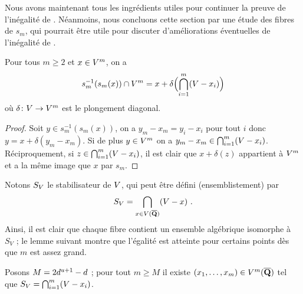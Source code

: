 Nous avons maintenant tous les ingrédients utiles pour continuer la preuve de
l'inégalité de . Néanmoins, nous concluons cette section par une
étude des fibres de \( s_m \), qui pourrait être utile pour discuter
d'améliorations éventuelles de l'inégalité de .

\begin{lem}
  Pour tous \( m \ge 2 \) et \( x \in V^m \), on a
  \begin{equation}
    s_m^{-1} ( s_m(x) ) \cap V^m
    =
    x + \delta\Bigl( \bigcap_{i=1}^m (V - x_i) \Bigr)
  \end{equation}
  où \( \delta \colon V \to V^m \) est le plongement diagonal.
\end{lem}

\begin{proof}
  Soit \( y \in s_m^{-1} ( s_m(x) ) \), on a
  \( y_m - x_m = y_i - x_i \) pour tout \( i \) donc \( y = x + \delta(y_m -
    x_m) \). Si de plus \( y \in V^m \) on a \( y_m - x_m \in
    \bigcap_{i=1}^m (V - x_i) \). Réciproquement, si \( z \in
    \bigcap_{i=1}^m (V - x_i) \), il est clair que \( x + \delta(z) \)
  appartient à \( V^m \) et a la même image que \( x \) par \( s_m \).
\end{proof}

Notons \( S_V \) le stabilisateur de \( V \), qui peut être défini
(ensemblistement) par
\begin{equation}
  S_V = \bigcap_{x \in V(\overline{{\mathbf{Q}}})} (V - x)
  \text{ .}
\end{equation}
Ainsi, il est clair que chaque fibre contient un ensemble algébrique isomorphe
à \( S_V \) ; le lemme suivant montre que l'égalité est atteinte pour certains
points dès que \( m \) est assez grand.

\begin{lem}
  Posons \( M = 2 d^{u+1} - d \) ; pour tout \( m \ge M \) il
  existe \( (x_1, \dots, x_m) \in V^m(\overline{{\mathbf{Q}}}) \) tel que
  \( S_V = \bigcap_{i=1}^m (V - x_i) \).
\end{lem}

